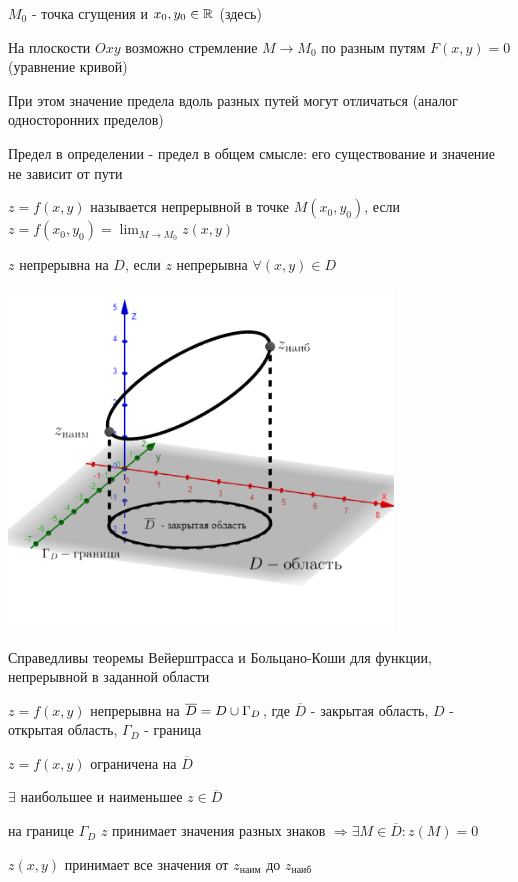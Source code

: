 \documentclass[12pt]{article}
\begin{document}
    $M_0$ - точка сгущения и $x_0, y_0 \in \mathbb{R}$ (здесь)

    \Nota На плоскости $Oxy$ возможно стремление $M \rightarrow M_0$ по разным путям $F(x, y) = 0$ (уравнение кривой)

    При этом значение предела вдоль разных путей могут отличаться (аналог односторонних пределов)

    Предел в определении - предел в общем смысле: его существование и значение не зависит от пути

    \hypertarget{continuityoffunctionoftwovariables}{}
    \Def $z = f(x, y)$ называется непрерывной в точке $M(x_0, y_0)$, если $z = f(x_0, y_0) = \lim_{M \to M_0} z(x, y)$

    $z$ непрерывна на $D$, если $z$ непрерывна $\forall (x, y) \in D$

    \includegraphics[height=90mm]{calculus/images/calculus_2024_02_28_3}

    \Nota Справедливы теоремы Вейерштрасса и Больцано-Коши для функции, непрерывной в заданной области

    $z = f(x, y)$ непрерывна на $\overline{D} = D \cup \Gamma_D$, где $\overline{D}$ - закрытая область, $D$ - открытая область, $\Gamma_D$ - граница

     $z = f(x, y)$ ограничена на $\overline{D}$

     $\exists$ наибольшее и наименьшее $z \in \overline{D}$

     на границе $\Gamma_D$ $z$ принимает значения разных знаков $\Longrightarrow \exists M \in \overline{D} : z(M) = 0$

     $z(x, y)$ принимает все значения от $z_{\text{наим}}$ до $z_{\text{наиб}}$ \\[1\baselineskip]
\end{document}

